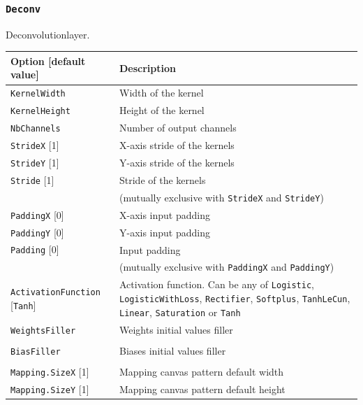 \documentclass[a4paper,11pt,oneside]{article}
\begin{document}
\subsubsection{\texorpdfstring{%
\lstinline[basicstyle=\ttfamily\bfseries]!Deconv!}{Deconv}}
Deconvolutionlayer.

\begin{center}
 \begin{longtable}{| p{5cm} | p{10cm} | }
 \hline
 Option [default value] & Description\\
 \hline\hline
  \cellcolor{requiredcolor}\lstinline!KernelWidth! & Width of the kernel \\
  \cellcolor{requiredcolor}\lstinline!KernelHeight! & Height of the kernel \\
  \cellcolor{requiredcolor}\lstinline!NbChannels! & Number of output channels \\
  \lstinline!StrideX! [1] & X-axis stride of the kernels \\
  \lstinline!StrideY! [1] & Y-axis stride of the kernels \\
  \lstinline!Stride! [1] & Stride of the kernels \\
   & (mutually exclusive with \lstinline!StrideX! and \lstinline!StrideY!) \\
  \lstinline!PaddingX! [0] & X-axis input padding \\
  \lstinline!PaddingY! [0] & Y-axis input padding \\
  \lstinline!Padding! [0] & Input padding \\
   & (mutually exclusive with \lstinline!PaddingX! and \lstinline!PaddingY!) \\
  \lstinline!ActivationFunction! [\lstinline!Tanh!] & Activation function.
  Can be any of \lstinline!Logistic!,  \lstinline!LogisticWithLoss!,
  \lstinline!Rectifier!, \lstinline!Softplus!, \lstinline!TanhLeCun!,
  \lstinline!Linear!, \lstinline!Saturation! or \lstinline!Tanh! \\
  \lstinline!WeightsFiller! & Weights initial values filler \\
   & \\
  \lstinline!BiasFiller! & Biases initial values filler \\
   & \\
  \lstinline!Mapping.SizeX! [1] & Mapping canvas pattern default width \\
  \lstinline!Mapping.SizeY! [1] & Mapping canvas pattern default height \\

\end{longtable}
\end{center}
\end{document}
